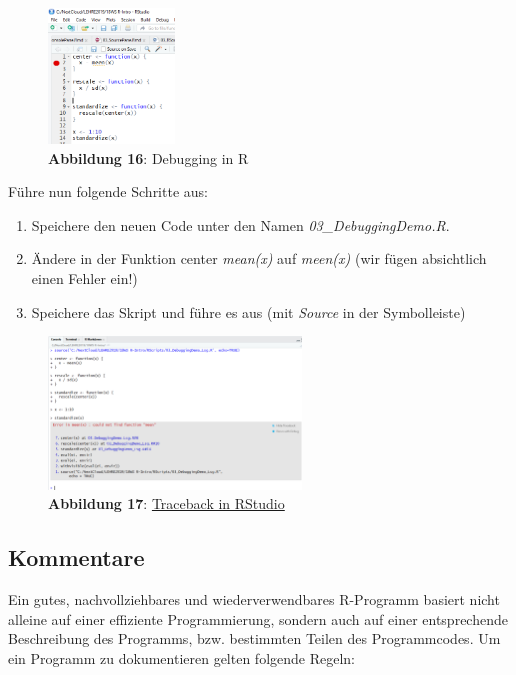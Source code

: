 \documentclass[]{article}
\providecommand{\tightlist}{%
  \setlength{\itemsep}{0pt}\setlength{\parskip}{0pt}}
\begin{document}
\begin{figure}
\centering
\includegraphics[width=0.30000\textwidth]{Images/03_R_Debugging.PNG}
\caption{\textbf{Abbildung 16}: Debugging in R}
\end{figure}

Führe nun folgende Schritte aus:

\begin{enumerate}
\def\labelenumi{\arabic{enumi}.}
\tightlist
\item
  Speichere den neuen Code unter den Namen \emph{03\_DebuggingDemo.R}.
\item
  Ändere in der Funktion center \emph{mean(x)} auf \emph{meen(x)} (wir
  fügen absichtlich einen Fehler ein!)
\item
  Speichere das Skript und führe es aus (mit \emph{Source} in der
  Symbolleiste)
\end{enumerate}

\begin{figure}
\centering
\includegraphics[width=0.60000\textwidth]{Images/03_Traceback.PNG}
\caption{\textbf{Abbildung 17}:
\href{https://google.github.io/styleguide/Rguide.xml\#comments}{Traceback
in RStudio}}
\end{figure}

\subsection*{Kommentare}\label{kommentare}

Ein gutes, nachvollziehbares und wiederverwendbares R-Programm basiert
nicht alleine auf einer effiziente Programmierung, sondern auch auf
einer entsprechende Beschreibung des Programms, bzw. bestimmten Teilen
des Programmcodes. Um ein Programm zu dokumentieren gelten folgende
Regeln:
\end{document}
